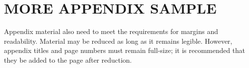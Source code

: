 \chapter{MORE APPENDIX SAMPLE}
Appendix material also need to meet the requirements for margins and readability. Material may be reduced as long as it remains legible. However, appendix titles and page numbers must remain full-size; it is recommended that they be added to the page after reduction.